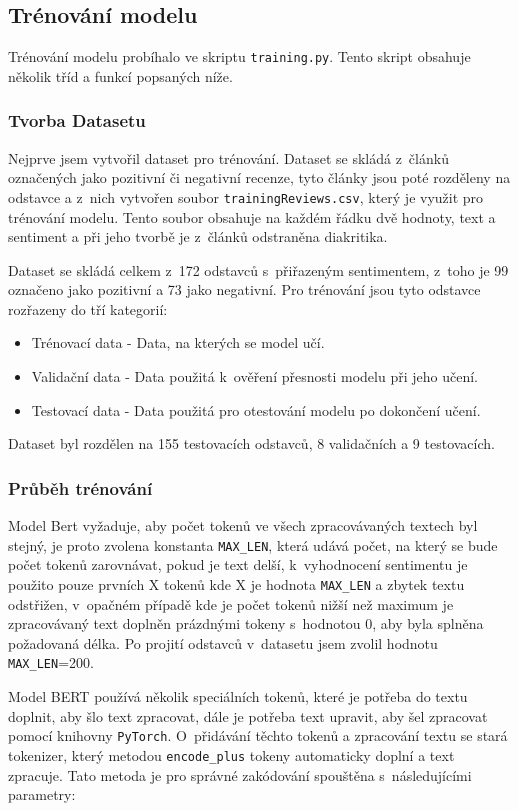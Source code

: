 \subsection*{Trénování modelu}
Trénování modelu probíhalo ve skriptu \verb|training.py|. Tento skript obsahuje několik tříd a funkcí popsaných níže. 

\subsubsection*{Tvorba Datasetu}
Nejprve jsem vytvořil dataset pro trénování. Dataset se skládá z~článků označených jako pozitivní či negativní recenze, tyto články jsou poté rozděleny na odstavce a z~nich vytvořen soubor \verb|trainingReviews.csv|, který je využit pro trénování modelu. Tento soubor obsahuje na každém řádku dvě hodnoty, text a sentiment a při jeho tvorbě je z~článků odstraněna diakritika.

Dataset se skládá celkem z~172 odstavců s~přiřazeným sentimentem, z~toho je 99 označeno jako pozitivní a 73 jako negativní. Pro trénování jsou tyto odstavce rozřazeny do tří kategorií:

\begin{itemize}
    \item Trénovací data - Data, na kterých se model učí.
    \item Validační data - Data použitá k~ověření přesnosti modelu při jeho učení.
    \item Testovací data - Data použitá pro otestování modelu po dokončení učení.
\end{itemize}

Dataset byl rozdělen na 155 testovacích odstavců, 8 validačních a 9 testovacích.

\subsubsection*{Průběh trénování}
Model Bert vyžaduje, aby počet tokenů ve všech zpracovávaných textech byl stejný, je proto zvolena konstanta \verb|MAX_LEN|, která udává počet, na který se bude počet tokenů zarovnávat, pokud je text delší, k~vyhodnocení sentimentu je použito pouze prvních X tokenů kde X je hodnota \verb|MAX_LEN| a zbytek textu odstřižen, v~opačném případě kde je počet tokenů nižší než maximum je zpracovávaný text doplněn prázdnými tokeny s~hodnotou 0, aby byla splněna požadovaná délka. Po projití odstavců v~datasetu jsem zvolil hodnotu \verb|MAX_LEN|=200.

Model BERT používá několik speciálních tokenů, které je potřeba do textu doplnit, aby šlo text zpracovat, dále je potřeba text upravit, aby šel zpracovat pomocí knihovny \verb|PyTorch|. O~přidávání těchto tokenů a zpracování textu se stará tokenizer, který metodou \verb|encode_plus| tokeny automaticky doplní a text zpracuje. Tato metoda je pro správné zakódování spouštěna s~následujícími parametry:

